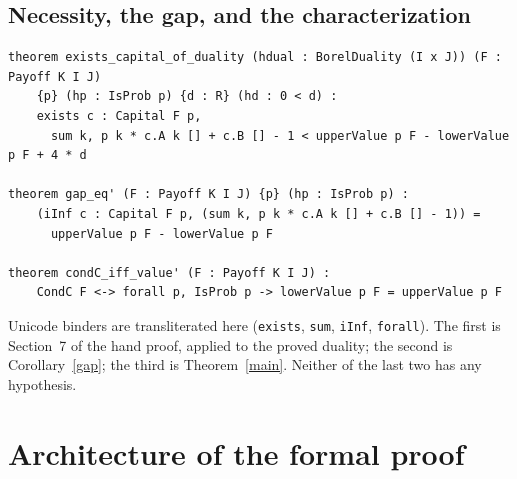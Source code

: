 \documentclass[11pt]{article}
\theoremstyle{definition}
\begin{document}
\subsection*{Necessity, the gap, and the characterization}
\begin{verbatim}
theorem exists_capital_of_duality (hdual : BorelDuality (I x J)) (F : Payoff K I J)
    {p} (hp : IsProb p) {d : R} (hd : 0 < d) :
    exists c : Capital F p,
      sum k, p k * c.A k [] + c.B [] - 1 < upperValue p F - lowerValue p F + 4 * d

theorem gap_eq' (F : Payoff K I J) {p} (hp : IsProb p) :
    (iInf c : Capital F p, (sum k, p k * c.A k [] + c.B [] - 1)) =
      upperValue p F - lowerValue p F

theorem condC_iff_value' (F : Payoff K I J) :
    CondC F <-> forall p, IsProb p -> lowerValue p F = upperValue p F
\end{verbatim}
Unicode binders are transliterated here (\texttt{exists}, \texttt{sum}, \texttt{iInf}, \texttt{forall}). The first is Section~7 of the hand proof, applied to the proved duality; the second is Corollary~\ref{gap}; the third is Theorem~\ref{main}. Neither of the last two has any hypothesis.

\section{Architecture of the formal proof}
\end{document}
